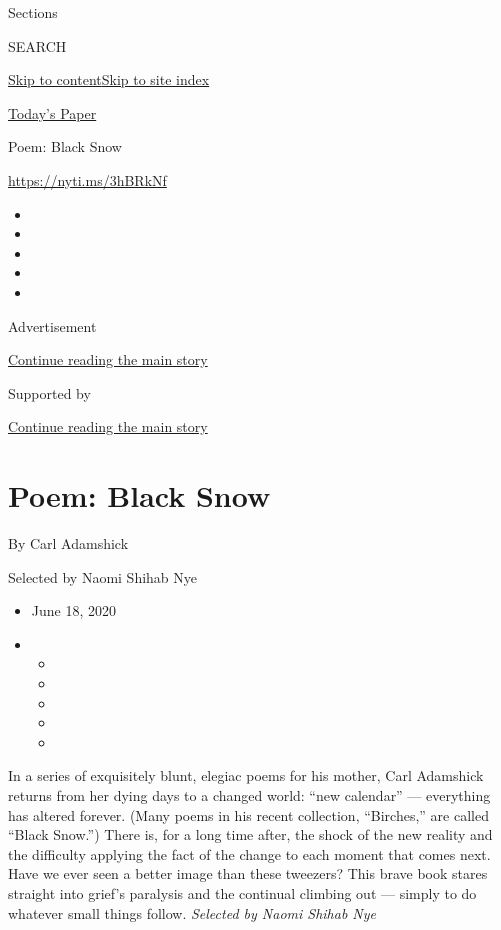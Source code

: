 Sections

SEARCH

\protect\hyperlink{site-content}{Skip to
content}\protect\hyperlink{site-index}{Skip to site index}

\href{https://myaccount.nytimes3xbfgragh.onion/auth/login?response_type=cookie\&client_id=vi}{}

\href{https://www.nytimes3xbfgragh.onion/section/todayspaper}{Today's
Paper}

Poem: Black Snow

\url{https://nyti.ms/3hBRkNf}

\begin{itemize}
\item
\item
\item
\item
\item
\end{itemize}

Advertisement

\protect\hyperlink{after-top}{Continue reading the main story}

Supported by

\protect\hyperlink{after-sponsor}{Continue reading the main story}

\hypertarget{poem-black-snow}{%
\section{Poem: Black Snow}\label{poem-black-snow}}

By Carl Adamshick

Selected by Naomi Shihab Nye

\begin{itemize}
\item
  June 18, 2020
\item
  \begin{itemize}
  \item
  \item
  \item
  \item
  \item
  \end{itemize}
\end{itemize}

In a series of exquisitely blunt, elegiac poems for his mother, Carl
Adamshick returns from her dying days to a changed world: ``new
calendar'' --- everything has altered forever. (Many poems in his recent
collection, ``Birches,'' are called ``Black Snow.'') There is, for a
long time after, the shock of the new reality and the difficulty
applying the fact of the change to each moment that comes next. Have we
ever seen a better image than these tweezers? This brave book stares
straight into grief's paralysis and the continual climbing out ---
simply to do whatever small things follow. \emph{Selected by Naomi
Shihab Nye}

